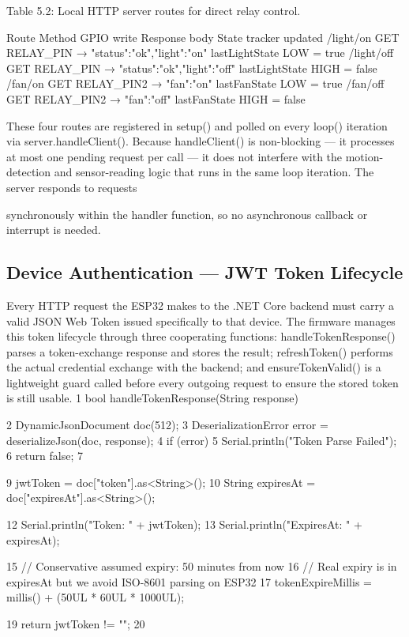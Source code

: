 Table 5.2: Local HTTP server routes for direct relay control.

Route Method GPIO write Response body State tracker
updated
/light/on GET RELAY\_PIN → {"status":"ok","light":"on"}
lastLightState
LOW = true
/light/off GET RELAY\_PIN → {"status":"ok","light":"off"}
lastLightState
HIGH = false
/fan/on GET RELAY\_PIN2 → {"fan":"on"} lastFanState
LOW = true
/fan/off GET RELAY\_PIN2 → {"fan":"off"} lastFanState
HIGH = false


These four routes are registered in setup() and polled on every loop() iteration via
server.handleClient(). Because handleClient() is non-blocking --- it processes at
most one pending request per call --- it does not interfere with the motion-detection and
sensor-reading logic that runs in the same loop iteration. The server responds to requests



synchronously within the handler function, so no asynchronous callback or interrupt is
needed.



\subsection{Device Authentication --- JWT Token Lifecycle}


Every HTTP request the ESP32 makes to the .NET Core backend must carry a valid JSON
Web Token issued speciﬁcally to that device. The ﬁrmware manages this token lifecycle
through three cooperating functions: handleTokenResponse() parses a token-exchange
response and stores the result; refreshToken() performs the actual credential exchange
with the backend; and ensureTokenValid() is a lightweight guard called before every
outgoing request to ensure the stored token is still usable.
1 bool handleTokenResponse(String response) {
2 DynamicJsonDocument doc(512);
3 DeserializationError error = deserializeJson(doc, response);
4 if (error) {
5 Serial.println("Token Parse Failed");
6 return false;
7 }


9 jwtToken = doc["token"].as<String>();
10 String expiresAt = doc["expiresAt"].as<String>();

12 Serial.println("Token: " + jwtToken);
13 Serial.println("ExpiresAt: " + expiresAt);

15 // Conservative assumed expiry: 50 minutes from now
16 // Real expiry is in expiresAt but we avoid ISO-8601 parsing on ESP32
17 tokenExpireMillis = millis() + (50UL * 60UL * 1000UL);

19 return jwtToken != "";
20 }


